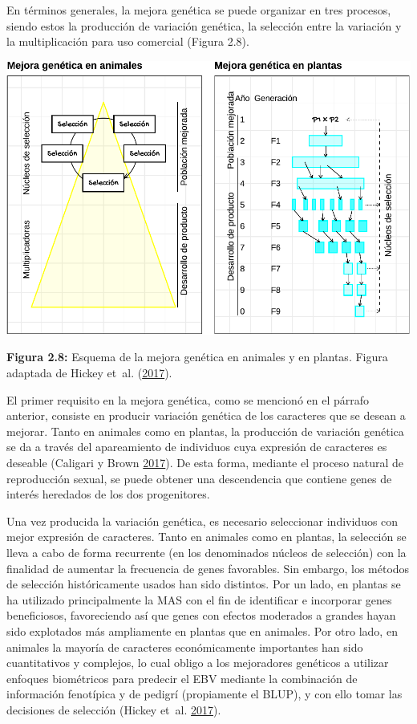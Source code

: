 \documentclass[11pt,spanish,a4paper,oneside,]{book} %
\begin{document}
En términos generales, la mejora genética se puede organizar en tres procesos, siendo estos la producción de variación genética, la selección entre la variación y la multiplicación para uso comercial (Figura 2.8).

\begin{center}\includegraphics[width=1\linewidth]{figures/Mej_Anim_Plan} \end{center}

\begin{center}
\textbf{Figura 2.8:} Esquema de la mejora genética en animales y en plantas. Figura adaptada de Hickey et~al. (\protect\hyperlink{ref-cite:44}{2017}).

\end{center}

El primer requisito en la mejora genética, como se mencionó en el párrafo anterior, consiste en producir variación genética de los caracteres que se desean a mejorar. Tanto en animales como en plantas, la producción de variación genética se da a través del apareamiento de individuos cuya expresión de caracteres es deseable (Caligari y Brown \protect\hyperlink{ref-cite:42}{2017}). De esta forma, mediante el proceso natural de reproducción sexual, se puede obtener una descendencia que contiene genes de interés heredados de los dos progenitores.

Una vez producida la variación genética, es necesario seleccionar individuos con mejor expresión de caracteres. Tanto en animales como en plantas, la selección se lleva a cabo de forma recurrente (en los denominados núcleos de selección) con la finalidad de aumentar la frecuencia de genes favorables. Sin embargo, los métodos de selección históricamente usados han sido distintos. Por un lado, en plantas se ha utilizado principalmente la MAS con el fin de identificar e incorporar genes beneficiosos, favoreciendo así que genes con efectos moderados a grandes hayan sido explotados más ampliamente en plantas que en animales. Por otro lado, en animales la mayoría de caracteres económicamente importantes han sido cuantitativos y complejos, lo cual obligo a los mejoradores genéticos a utilizar enfoques biométricos para predecir el EBV mediante la combinación de información fenotípica y de pedigrí (propiamente el BLUP), y con ello tomar las decisiones de selección (Hickey et~al. \protect\hyperlink{ref-cite:44}{2017}).
\end{document}
